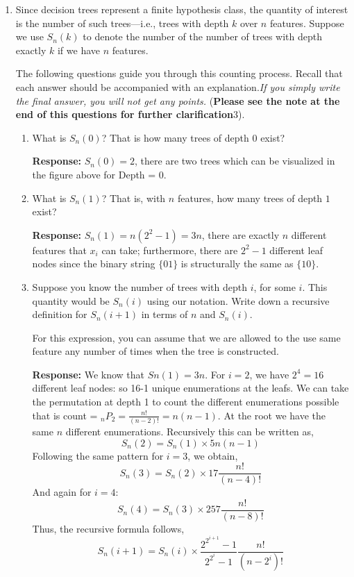 \begin{enumerate}
\item Since decision trees represent a finite hypothesis class, the quantity of
  interest is the number of such trees---i.e., trees with depth $k$ over $n$
  features. Suppose we use $S_n(k)$ to denote the number of the number of trees
  with depth exactly $k$ if we have $n$ features.

  The following questions guide you through this counting process. Recall that
  each answer should be accompanied with an explanation.\emph{If you simply
    write the final answer, you will not get any points.} (\textbf{Please see the note at the end of this questions for further clarification}3).

  \begin{enumerate}
  \item \relax[2 points] What is $S_n(0)$? That is how many trees of depth $0$
    exist? \newline
    
    \textbf{Response:} $S_n(0) = 2$, there are two trees which can be visualized in the figure above for Depth = 0.
    
  \item \relax[3 points] What is $S_n(1)$? That is, with $n$ features, how many
    trees of depth $1$ exist? \newline
    
    \textbf{Response:} $S_n(1) = n(2^2-1) = 3n$, there are exactly $n$ different features that $x_i$ can take; furthermore, there are $2^2-1$ different leaf nodes since the binary string $\{01\}$ is structurally the same as $\{10\}$. 
    
  \item \relax[4 points] Suppose you know the number of trees with depth $i$,
    for some $i$. This quantity would be $S_n(i)$ using our notation. Write down
    a recursive definition for $S_n(i+1)$ in terms of $n$ and $S_n(i)$.

    For this expression, you can assume that we are allowed to the use same
    feature any number of times when the tree is constructed. \newline
    
    \textbf{Response:} We know that $Sn(1) = 3n$.
    For $i = 2$, we have $2^4=16$ different leaf nodes: so 16-1 unique enumerations at the leafs. We can take the permutation at depth 1 to count the different enumerations possible that is count = $_n P_2 = \frac{n!}{(n-2)!} = n(n-1)$. At the root we have the same $n$ different enumerations. Recursively this can be written as, $$S_n(2)=S_n(1) \times 5n(n-1)$$
    Following the same pattern for $i=3$, we obtain, $$S_n(3)=S_n(2) \times 17 \frac{n!}{(n-4)!}$$
    And again for $i=4$: $$S_n(4) = S_n(3) \times 257 \frac{n!}{(n-8)!}$$
    Thus, the recursive formula follows,
    $$S_n(i+1) = S_n(i) \times \frac{2^{2^{i+1}}-1}{2^{2^i}-1} \frac{n!}{(n-2^i)!}$$


\end{enumerate}
\end{enumerate}
